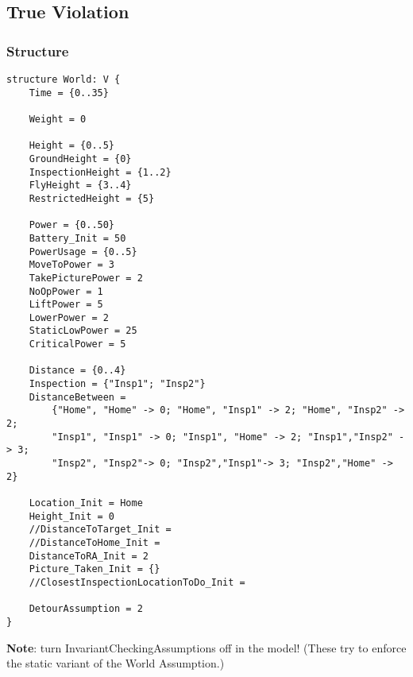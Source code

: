 \documentclass[12pt]{extarticle}
\begin{document}
\subsection{True Violation}
\label{app:worldassumptionstrueviolation}
\subsubsection*{Structure}
\begin{lstlisting}[basicstyle=\tiny]
structure World: V {
    Time = {0..35}
    
    Weight = 0

    Height = {0..5}
    GroundHeight = {0}
    InspectionHeight = {1..2}
    FlyHeight = {3..4}
    RestrictedHeight = {5}
    
    Power = {0..50}
    Battery_Init = 50
    PowerUsage = {0..5}
    MoveToPower = 3
    TakePicturePower = 2
    NoOpPower = 1
    LiftPower = 5
    LowerPower = 2
    StaticLowPower = 25
    CriticalPower = 5
    
    Distance = {0..4}
    Inspection = {"Insp1"; "Insp2"}
    DistanceBetween =
    	{"Home", "Home" -> 0; "Home", "Insp1" -> 2; "Home", "Insp2" -> 2;
        "Insp1", "Insp1" -> 0; "Insp1", "Home" -> 2; "Insp1","Insp2" -> 3;
    	"Insp2", "Insp2"-> 0; "Insp2","Insp1"-> 3; "Insp2","Home" -> 2}

    Location_Init = Home
    Height_Init = 0
    //DistanceToTarget_Init =
    //DistanceToHome_Init =
    DistanceToRA_Init = 2
    Picture_Taken_Init = {}
    //ClosestInspectionLocationToDo_Init =
    
    DetourAssumption = 2
}
\end{lstlisting}
\vspace{2mm}
\noindent
\textbf{Note}: turn InvariantCheckingAssumptions off in the model! (These try to enforce the static variant of the World Assumption.)\\
\end{document}
